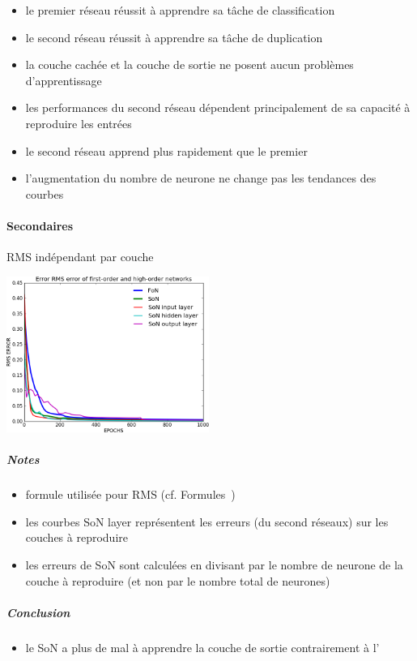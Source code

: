 	\begin{itemize}
	  \item le premier réseau réussit à apprendre sa tâche de classification
	  \item le second réseau réussit à apprendre sa tâche de duplication
	  \item la couche cachée et la couche de sortie ne posent aucun problèmes d'apprentissage
	  \item les performances du second réseau dépendent principalement de sa capacité à reproduire les entrées
	  \item le second réseau apprend plus rapidement que le premier
	  \item l'augmentation du nombre de neurone ne change pas les tendances des courbes
	\end{itemize}
    \paragraph{Secondaires}
      RMS indépendant par couche
      \begin{center}
	\includegraphics[width=250px]{data/expA2/rms_new.png}
      \end{center}
      \subparagraph{Notes}
	\begin{itemize}
	  \item formule utilisée pour RMS (cf. Formules~)
	  \item les courbes SoN layer représentent les erreurs (du second réseaux) sur les couches à reproduire
	  \item les erreurs de SoN sont calculées en divisant par le nombre de neurone de la couche à reproduire (et non par le nombre total de neurones)
	\end{itemize}
      \subparagraph{Conclusion}
	\begin{itemize}
	  \item le SoN a plus de mal à apprendre la couche de sortie contrairement à l'
	\end{itemize}
	
